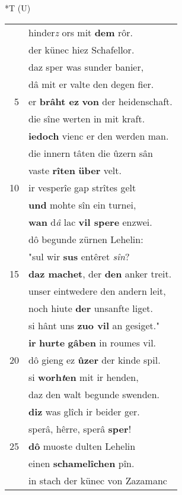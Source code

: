 \documentclass[8pt,a4paper,notitlepage]{article}
\begin{document}
\begin{table}[ht]
\begin{minipage}[t]{0.5\linewidth}
\end{minipage}
\hspace{0.5cm}
\begin{minipage}[t]{0.5\linewidth}
\small
\begin{center}*T (U)
\end{center}
\begin{tabular}{rl}
 & hinder\textit{z} ors mit \textbf{dem} rôr.\\ 
 & der künec hiez Schafellor.\\ 
 & daz sper was sunder banier,\\ 
 & dâ mit er valte den degen fier.\\ 
5 & er \textbf{brâht ez} \textbf{von} der heidenschaft.\\ 
 & die sîne werten in mit kraft.\\ 
 & \textbf{iedoch} vienc er den werden man.\\ 
 & die innern tâten die ûzern sân\\ 
 & vaste \textbf{rîten} \textbf{über} velt.\\ 
10 & ir vesperîe gap strîtes gelt\\ 
 & \textbf{und} mohte sîn ein turnei,\\ 
 & \textbf{wan} d\textit{â} lac \textbf{vil spere} enzwei.\\ 
 & dô begunde zürnen Lehelin:\\ 
 & "sul wir \textbf{sus} entêret \textit{sîn}?\\ 
15 & \textbf{daz machet}, der \textbf{den} anker treit.\\ 
 & unser eintwedere den andern leit,\\ 
 & noch hiute \textbf{der} unsanfte liget.\\ 
 & si hânt uns \textbf{zuo vil} an gesiget."\\ 
 & \textbf{ir} \textbf{hurte} \textbf{gâben} in roumes vil.\\ 
20 & dô gieng ez \textbf{ûzer} der kinde spil.\\ 
 & si \textbf{worh\textit{t}en} mit ir henden,\\ 
 & daz den walt begunde swenden.\\ 
 & \textbf{diz} was glîch ir beider ger.\\ 
 & sperâ, hêrre, sperâ \textbf{sper}!\\ 
25 & \textbf{dô} muoste dulten Lehelin\\ 
 & einen \textbf{schamelîchen} pîn.\\ 
 & in stach der künec von Zazamanc\\ 

\end{tabular}
\end{minipage}
\end{table}
\end{document}
